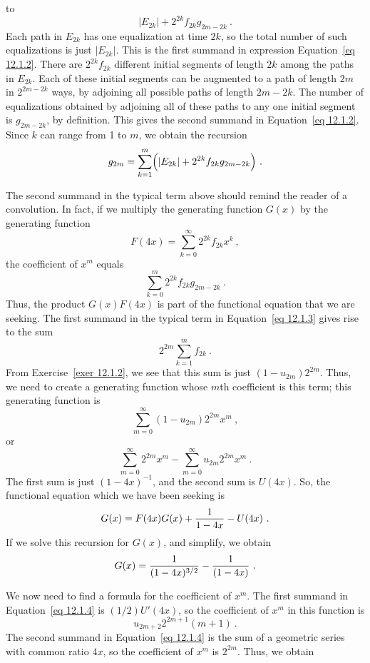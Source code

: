 \begin{example}
to 
\begin{equation}
|E_{2k}| + 2^{2k} f_{2k} g_{2m - 2k}\ .
\label{eq 12.1.2}  
\end{equation}
Each path in $E_{2k}$ has one equalization at time $2k$, so the total number of such
equalizations is just $|E_{2k}|$.  This is the first summand in expression Equation~\ref{eq 12.1.2}. 
There are $2^{2k} f_{2k}$ different initial segments of length $2k$ among the paths in
$E_{2k}$.  Each of these initial segments can be augmented to a path of length $2m$ in
$2^{2m-2k}$ ways, by adjoining all possible paths of length $2m - 2k$.  The
number of equalizations obtained by adjoining all of these paths to any one initial segment is
$g_{2m - 2k}$, by definition.  This gives the second summand in Equation~\ref{eq 12.1.2}.  Since $k$
can range from 1 to $m$, we obtain the recursion
\begin{equation}  
g_{2m} = \sum_{k = 1}^m \Bigl(|E_{2k}| + 2^{2k}f_{2k}g_{2m - 2k}\Bigr)\ .
\label{eq 12.1.3}  
\end{equation}                                                                        
\par
The second summand in the typical term above should remind the reader of a convolution.  In
fact, if we multiply the generating function $G(x)$ by the generating function 
$$F(4x) = \sum_{k = 0}^\infty 2^{2k}f_{2k} x^k\ ,$$
the coefficient of $x^m$ equals
$$\sum_{k = 0}^m 2^{2k}f_{2k}g_{2m-2k}\ .$$
Thus, the product $G(x)F(4x)$ is part of the functional equation that we are seeking.  The
first summand in the typical term in Equation~\ref{eq 12.1.3} gives rise to the sum
$$2^{2m}\sum_{k = 1}^m f_{2k}\ .$$
From Exercise~\ref{exer 12.1.2}, we see that this sum is just $(1 - u_{2m})2^{2m}$.    Thus, we need to
create a generating function whose $m$th coefficient is this term; this generating function is
$$\sum_{m = 0}^\infty (1- u_{2m})2^{2m} x^m\ ,$$
or
$$\sum_{m = 0}^\infty 2^{2m} x^m - \sum_{m = 0}^\infty u_{2m}2^{2m} x^m\ .$$
The first sum is just $(1-4x)^{-1}$, and the second sum is $U(4x)$.  So, the functional
equation which we have been seeking is
$$G(x) = F(4x)G(x) + {1\over{1-4x}} - U(4x)\ .$$
If we solve this recursion for $G(x)$, and simplify, we obtain
\begin{equation}  
G(x) = {1\over{(1-4x)^{3/2}}} - {1\over{(1-4x)}}\ .
\label{eq 12.1.4}  
\end{equation}                                                                        
\par
We now need to find a formula for the coefficient of $x^m$.  The first summand in 
Equation~\ref{eq 12.1.4} is $(1/2)U'(4x)$, so the coefficient of $x^m$ in this function is
$$u_{2m+2} 2^{2m+1}(m+1)\ .$$
The second summand in Equation~\ref{eq 12.1.4} is the sum of a geometric series with common 
ratio $4x$, so the coefficient of $x^m$ is $2^{2m}$.  Thus, we obtain


\end{example}
